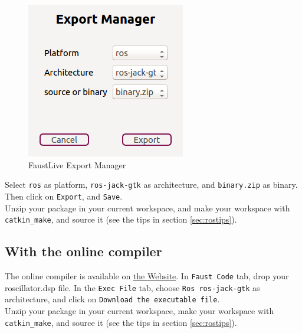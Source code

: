 \begin{figure}[ht!]
\centering
\includegraphics[scale=0.5]{images/faustlive-export.png}
\caption{FaustLive Export Manager}
\label{fig:welcomefaustlive}
\end{figure}

Select \texttt{ros} as platform, \texttt{ros-jack-gtk} as architecture, and \texttt{binary.zip} 
as binary. Then click on \texttt{Export}, and \texttt{Save}. \\
Unzip your package in your current \ros workspace, and make your workspace with 
\texttt{catkin\_make}, and source it (see the \ros tips in section \ref{sec:rostips}).


\subsection{With the online compiler}
The online compiler is available on \href{http://faust.grame.fr/index.php/online-examples}{the 
\faust Website}. In \texttt{Faust Code} tab, drop your roscillator.dsp file.  In the 
\texttt{Exec File} tab, choose \texttt{Ros ros-jack-gtk} as architecture, and click on 
\texttt{Download the executable file}.\\
Unzip your package in your current \ros workspace, make your workspace with 
\texttt{catkin\_make}, and source it (see the \ros tips in section \ref{sec:rostips}).

\newpage

